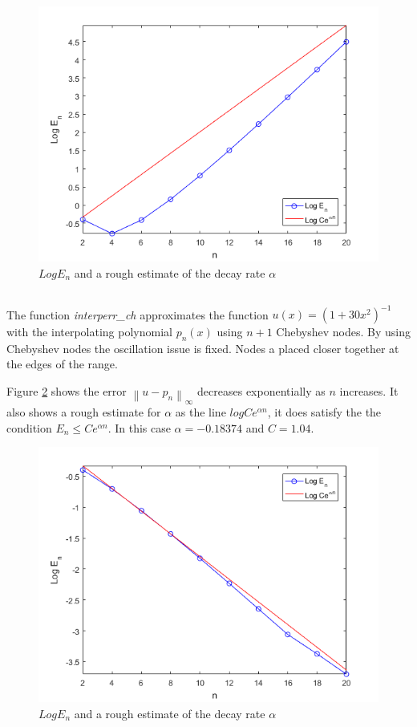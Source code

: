 \documentclass[12pt]{article}
\newcommand{\norm}[1]{\left\lVert#1\right\rVert}
\begin{document}
\noindent
\begin{minipage}{\linewidth}

\end{minipage}

\begin{figure}
    \includegraphics[width=.6\linewidth]{eq_err_alpha}
    \centering
    \caption{$Log E_n$ and a rough estimate of the decay rate $\alpha$}
    \label{fig_eq_err_alpha}
\end{figure}

\subsection{} %

The function \textit{interperr\_ch} approximates the function $u(x) = (1+30x^2)^{-1}$ with the interpolating polynomial $p_n(x)$ using $n+1$ Chebyshev nodes. By using Chebyshev nodes the oscillation issue is fixed. Nodes a placed closer together at the edges of the range.

Figure \ref{fig_ch_err_alpha} shows the error $\norm{u-p_n}_{\infty}$ decreases exponentially as $n$ increases.
It also shows a rough estimate for $\alpha$ as the line $log Ce^{\alpha n}$, it does satisfy the the condition $E_n \le Ce^{\alpha n}$.
In this case $\alpha = -0.18374$ and $C = 1.04$.

\noindent
\begin{minipage}{\linewidth}

\end{minipage}

\begin{figure}
    \includegraphics[width=.6\linewidth]{ch_err_alpha}
    \centering
    \caption{$Log E_n$ and a rough estimate of the decay rate $\alpha$}
    \label{fig_ch_err_alpha}
\end{figure}
\end{document}

